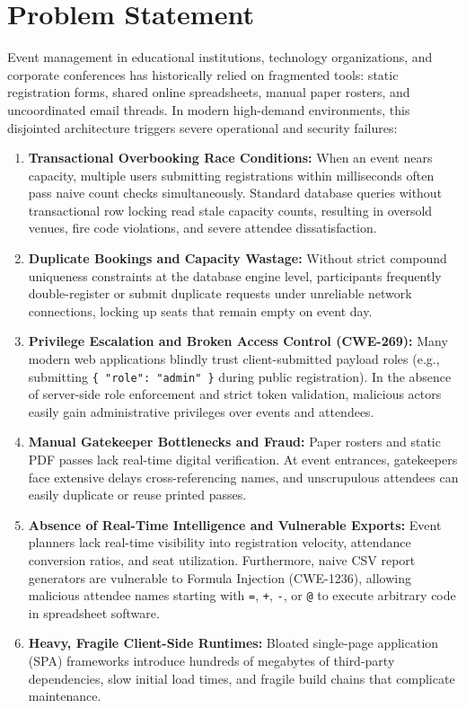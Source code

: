 \documentclass[11pt,a4paper]{article}
\begin{document}
\newpage
\section*{{\color{TitleBlue}\bfseries
\fontsize{18}{22}\selectfont Problem Statement}}

\justifying

Event management in educational institutions, technology organizations, and corporate conferences has historically relied on fragmented tools: static registration forms, shared online spreadsheets, manual paper rosters, and uncoordinated email threads. In modern high-demand environments, this disjointed architecture triggers severe operational and security failures:

\begin{enumerate}[leftmargin=*]
    \item \textbf{Transactional Overbooking Race Conditions:} When an event nears capacity, multiple users submitting registrations within milliseconds often pass naive count checks simultaneously. Standard database queries without transactional row locking read stale capacity counts, resulting in oversold venues, fire code violations, and severe attendee dissatisfaction.
    \item \textbf{Duplicate Bookings and Capacity Wastage:} Without strict compound uniqueness constraints at the database engine level, participants frequently double-register or submit duplicate requests under unreliable network connections, locking up seats that remain empty on event day.
    \item \textbf{Privilege Escalation and Broken Access Control (CWE-269):} Many modern web applications blindly trust client-submitted payload roles (e.g., submitting \texttt{\{ "role": "admin" \}} during public registration). In the absence of server-side role enforcement and strict token validation, malicious actors easily gain administrative privileges over events and attendees.
    \item \textbf{Manual Gatekeeper Bottlenecks and Fraud:} Paper rosters and static PDF passes lack real-time digital verification. At event entrances, gatekeepers face extensive delays cross-referencing names, and unscrupulous attendees can easily duplicate or reuse printed passes.
    \item \textbf{Absence of Real-Time Intelligence and Vulnerable Exports:} Event planners lack real-time visibility into registration velocity, attendance conversion ratios, and seat utilization. Furthermore, naive CSV report generators are vulnerable to Formula Injection (CWE-1236), allowing malicious attendee names starting with \texttt{=}, \texttt{+}, \texttt{-}, or \texttt{@} to execute arbitrary code in spreadsheet software.
    \item \textbf{Heavy, Fragile Client-Side Runtimes:} Bloated single-page application (SPA) frameworks introduce hundreds of megabytes of third-party dependencies, slow initial load times, and fragile build chains that complicate maintenance.
\end{enumerate}
\end{document}
